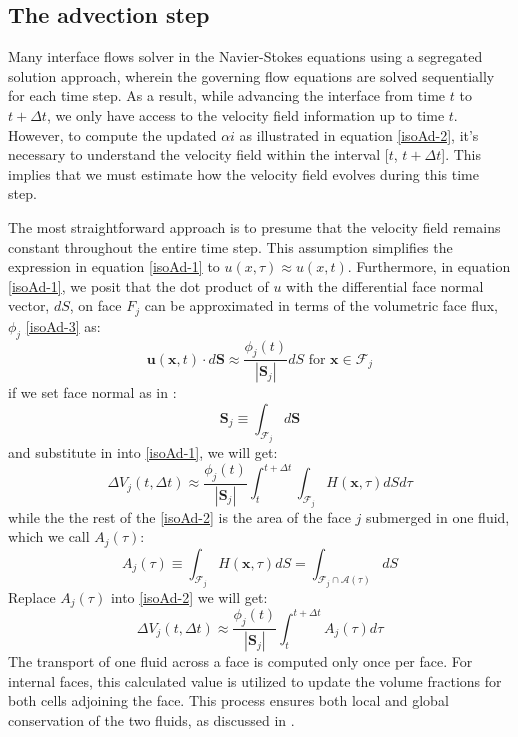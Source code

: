 \subsection{The advection step}
Many interface flows solver in the Navier-Stokes equations using a segregated solution approach, wherein the governing flow equations are solved sequentially for each time step. As a result, while advancing the interface from time $t$ to $t + \Delta t$, we only have access to the velocity field information up to time $t$. However, to compute the updated $\alpha i$ as illustrated in equation \ref{isoAd-2}, it's necessary to understand the velocity field within the interval [$t$, $t + \Delta t$]. This implies that we must estimate how the velocity field evolves during this time step.

The most straightforward approach is to presume that the velocity field remains constant throughout the entire time step. This assumption simplifies the expression in equation \ref{isoAd-1} to $u(x, \tau) \approx u(x, t)$. Furthermore, in equation \ref{isoAd-1}, we posit that the dot product of $u$ with the differential face normal vector, $dS$, on face $F_j$ can be approximated in terms of the volumetric face flux, $\phi_j$  \ref{isoAd-3} as:
\begin{equation}
\mathbf{u}(\mathbf{x}, t) \cdot d \mathbf{S} \approx \frac{\phi_{j}(t)}{\left|\mathbf{S}_{j}\right|} d S \text { for } \mathbf{x} \in \mathcal{F}_{j}
\end{equation}
if we set face normal as in \cite{roenby2019isoadvector}:
\begin{equation}
\mathbf{S}_{j} \equiv \int_{\mathcal{F}_{j}} d \mathbf{S}
\end{equation}
and substitute in into \ref{isoAd-1}, we will get:
\begin{equation}\label{isoAd-2}
\Delta V_{j}(t, \Delta t) \approx \frac{\phi_{j}(t)}{\left|\mathbf{S}_{j}\right|} \int_{t}^{t+\Delta t} \int_{\mathcal{F}_{j}} H(\mathbf{x}, \tau) d S d \tau
\end{equation}
while the the rest of the \ref{isoAd-2} is the area of the face $j$ submerged in one fluid, which we call $A_{j}(\tau)$:
\begin{equation}
A_{j}(\tau) \equiv \int_{\mathcal{F}_{j}} H(\mathbf{x}, \tau) d S=\int_{\mathcal{F}_{j} \cap \mathcal{A}(\tau)} d S
\end{equation}
Replace $A_{j}(\tau)$ into \ref{isoAd-2} we will get:
\begin{equation}
\Delta V_{j}(t, \Delta t) \approx \frac{\phi_{j}(t)}{\left|\mathbf{S}_{j}\right|} \int_{t}^{t+\Delta t} A_{j}(\tau) d \tau
\end{equation}
The transport of one fluid across a face is computed only once per face. For internal faces, this calculated value is utilized to update the volume fractions for both cells adjoining the face. This process ensures both local and global conservation of the two fluids, as discussed in \cite{roenby2019isoadvector}.
